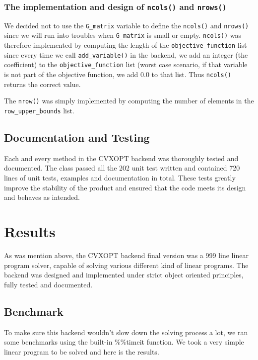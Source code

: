 \subsubsection{The implementation and design of \texttt{ncols()} and \texttt{nrows()}}

We decided not to use the \texttt{G\_matrix} variable to define the \texttt{ncols()} and \texttt{nrows()} since we will run into troubles when  \texttt{G\_matrix} is small or empty. \texttt{ncols()} was therefore implemented by computing the length of the \texttt{objective\_function} list since every time we call \texttt{add\_variable()} in the backend, we add an integer (the coefficient) to the \texttt{objective\_function} list (worst case scenario, if that variable is not part of the objective function, we add 0.0 to that list. Thus  \texttt{ncols()} returns the correct value. 

The \texttt{nrow()} was simply implemented by computing the number of elements in the \texttt{row\_upper\_bounds} list.




\subsection{Documentation and Testing}

Each and every method in the CVXOPT backend was thoroughly tested and documented. The class passed all the 202 unit test written and contained 720 lines of unit tests, examples and documentation in total. These tests greatly improve the stability of the product and ensured that the code meets its design and behaves as intended.   



\section{Results}
As was mention above, the CVXOPT backend final version was a 999 line linear program solver, capable of solving various different kind of linear programs. The backend was designed and implemented under strict object oriented principles, fully tested and documented.

\subsection{Benchmark}
To make sure this backend wouldn't slow down the solving process a lot, we ran some benchmarks using the built-in \%\%timeit function. We took a very simple linear program to be solved and here is the results.

